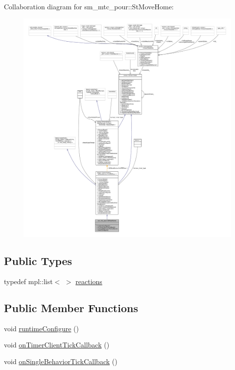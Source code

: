 Collaboration diagram for sm\+\_\+mtc\+\_\+pour\+:\+:St\+Move\+Home\+:
\nopagebreak
\begin{figure}[H]
\begin{center}
\leavevmode
\includegraphics[width=350pt]{structsm__mtc__pour_1_1StMoveHome__coll__graph}
\end{center}
\end{figure}
\subsection*{Public Types}
\begin{DoxyCompactItemize}
\item 
typedef mpl\+::list$<$  $>$ \hyperlink{structsm__mtc__pour_1_1StMoveHome_ae6e8aae509386db027d9b5e9fcc6854d}{reactions}
\end{DoxyCompactItemize}
\subsection*{Public Member Functions}
\begin{DoxyCompactItemize}
\item 
void \hyperlink{structsm__mtc__pour_1_1StMoveHome_a37c34e99ab34d51df009bfbdf3bf58c4}{runtime\+Configure} ()
\item 
void \hyperlink{structsm__mtc__pour_1_1StMoveHome_aefb3779587307fbc30a45358ac4efaf5}{on\+Timer\+Client\+Tick\+Callback} ()
\item 
void \hyperlink{structsm__mtc__pour_1_1StMoveHome_a689ca4cdb710390cffdd7145dace9884}{on\+Single\+Behavior\+Tick\+Callback} ()
\end{DoxyCompactItemize}
